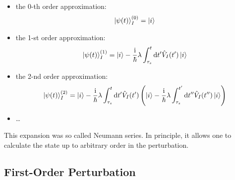 \begin{itemize}
    \item the 0-th order approximation: 
\begin{align}
    \ket{\psi(t)}_I^{(0)} = \ket{i}
\end{align}
    \item the 1-st order approximation:
    \begin{align}
        \ket{\psi(t)}_I^{(1)} = \ket{i} - \frac{\mathrm{i}}{\hbar} \lambda\int_{\tau_s}^{t} \mathrm{d} t' \hat{V}_I(t') \ket{i} \label{eq:first_order_timeper}
    \end{align}
    \item the 2-nd order approximation:
    \begin{align}
        \ket{\psi(t)}_I^{(2)} = \ket{i} - \frac{\mathrm{i}}{\hbar} \lambda \int_{\tau_s}^{t} \mathrm{d} t' \hat{V}_I(t') \left( \ket i - \frac{\mathrm{i}}{\hbar} \lambda \int_{\tau_s}^{t'} \mathrm{d} t'' \hat{V}_I(t'') \ket{i} \right)
    \end{align}
    \item \dots 
\end{itemize}
This expansion was so called Neumann series. In principle, it allows one to calculate the state up to arbitrary order in the perturbation.

\subsection{First-Order Perturbation}

